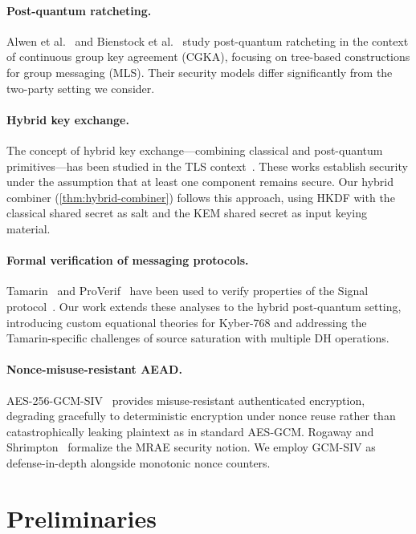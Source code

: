 \documentclass[11pt,a4paper]{article}
\theoremstyle{definition}
\begin{document}
\paragraph{Post-quantum ratcheting.}
Alwen et al.~\cite{alwen2020} and Bienstock et al.~\cite{bienstock2022} study post-quantum ratcheting in the context of continuous group key agreement (CGKA), focusing on tree-based constructions for group messaging (MLS). Their security models differ significantly from the two-party setting we consider.

\paragraph{Hybrid key exchange.}
The concept of hybrid key exchange---combining classical and post-quantum primitives---has been studied in the TLS context~\cite{stebila2020,dowling2020}. These works establish security under the assumption that at least one component remains secure. Our hybrid combiner (\cref{thm:hybrid-combiner}) follows this approach, using HKDF with the classical shared secret as salt and the KEM shared secret as input keying material.

\paragraph{Formal verification of messaging protocols.}
Tamarin~\cite{meier2013} and ProVerif~\cite{blanchet2016} have been used to verify properties of the Signal protocol~\cite{cohn-gordon2020}. Our work extends these analyses to the hybrid post-quantum setting, introducing custom equational theories for Kyber-768 and addressing the Tamarin-specific challenges of source saturation with multiple DH operations.

\paragraph{Nonce-misuse-resistant AEAD.}
AES-256-GCM-SIV~\cite{rfc8452} provides misuse-resistant authenticated encryption, degrading gracefully to deterministic encryption under nonce reuse rather than catastrophically leaking plaintext as in standard AES-GCM. Rogaway and Shrimpton~\cite{rogaway2006} formalize the MRAE security notion. We employ GCM-SIV as defense-in-depth alongside monotonic nonce counters.


\section{Preliminaries}\label{sec:prelim}
\end{document}

